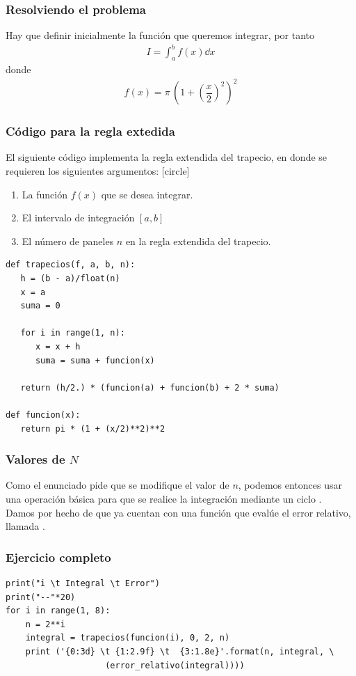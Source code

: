 \begin{frame}
\frametitle{Resolviendo el problema}
Hay que definir inicialmente la función que queremos integrar, por tanto
\begin{align*}
I = \int_{a}^{b} f(x) \dd{x}
\end{align*}
donde
\begin{align*}
f(x) = \pi \, \left( 1 + \left( \dfrac{x}{2} \right)^{2} \right)^{2}
\end{align*}
\end{frame}
\begin{frame}
\frametitle{Código para la regla extedida}
El siguiente código implementa la regla extendida del trapecio, en donde se requieren los siguientes argumentos:
[circle]
\begin{enumerate}[<+->]
\item La función $f(x)$ que se desea integrar.
\item El intervalo de integración $[a, b]$
\item El número de paneles $n$ en la regla extendida del trapecio.
\end{enumerate}
\end{frame}
\begin{frame}
\begin{lstlisting}[caption=Código para la función trapecios, style=FormattedNumber, basicstyle=\linespread{1.1}\ttfamily=\small, columns=fullflexible]
def trapecios(f, a, b, n):
   h = (b - a)/float(n)
   x = a
   suma = 0
   
   for i in range(1, n):
      x = x + h
      suma = suma + funcion(x)
   
   return (h/2.) * (funcion(a) + funcion(b) + 2 * suma)

def funcion(x):
   return pi * (1 + (x/2)**2)**2
\end{lstlisting}
\end{frame}
\begin{frame}
\frametitle{Valores de $N$}
Como el enunciado pide que se modifique el valor de $n$, podemos entonces usar una operación básica para que se realice la integración mediante un ciclo .
\\
\bigskip
Damos por hecho de que ya cuentan con una función que evalúe el error relativo, llamada .
\end{frame}
\begin{frame}[fragile]
\frametitle{Ejercicio completo}
\begin{lstlisting}[caption=Completamos el código y evaluamos el error, style=FormattedNumber, basicstyle=\linespread{1.1}\ttfamily=\small, columns=fullflexible]
print("i \t Integral \t Error")
print("--"*20)
for i in range(1, 8):
    n = 2**i
    integral = trapecios(funcion(i), 0, 2, n)
    print ('{0:3d} \t {1:2.9f} \t  {3:1.8e}'.format(n, integral, \
                    (error_relativo(integral))))
\end{lstlisting}
\end{frame}
